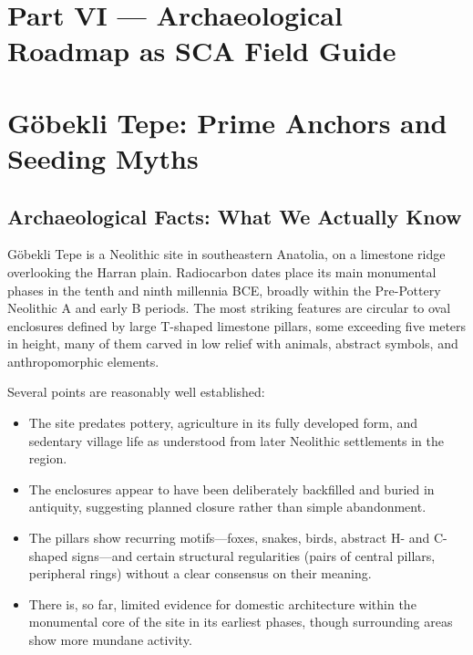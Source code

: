 \documentclass[12]{amsart}
\theoremstyle{plain}
\begin{document}

\section*{Part VI — Archaeological Roadmap as SCA Field Guide}

\section{Göbekli Tepe: Prime Anchors and Seeding Myths}

\subsection{Archaeological Facts: What We Actually Know}

Göbekli Tepe is a Neolithic site in southeastern Anatolia, on a limestone ridge overlooking the Harran plain. Radiocarbon dates place its main monumental phases in the tenth and ninth millennia BCE, broadly within the Pre-Pottery Neolithic A and early B periods. The most striking features are circular to oval enclosures defined by large T-shaped limestone pillars, some exceeding five meters in height, many of them carved in low relief with animals, abstract symbols, and anthropomorphic elements.

Several points are reasonably well established:

\begin{itemize}
  \item The site predates pottery, agriculture in its fully developed form, and sedentary village life as understood from later Neolithic settlements in the region.
  \item The enclosures appear to have been deliberately backfilled and buried in antiquity, suggesting planned closure rather than simple abandonment.
  \item The pillars show recurring motifs---foxes, snakes, birds, abstract H- and C-shaped signs---and certain structural regularities (pairs of central pillars, peripheral rings) without a clear consensus on their meaning.
  \item There is, so far, limited evidence for domestic architecture within the monumental core of the site in its earliest phases, though surrounding areas show more mundane activity.
\end{itemize}
\end{document}
